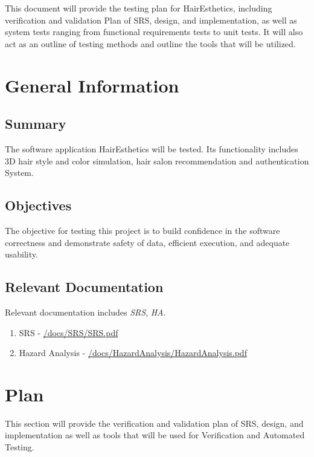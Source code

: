 \documentclass[12pt, titlepage]{article}
\begin{document}
\newpage


This document will provide the testing plan for HairEsthetics, including verification and validation Plan of SRS, design, and implementation, as well as system tests ranging from functional requirements tests to unit tests. It will also act as an outline of testing methods and outline the tools that will be utilized.

\section{General Information}

\subsection{Summary}


  The software application HairEsthetics will be tested. Its functionality includes 3D hair style and color simulation, hair salon recommendation and authentication System. 

\subsection{Objectives}

The objective for testing this project is to build confidence in the software correctness and demonstrate
safety of data, efficient execution, and adequate usability. 

\subsection{Relevant Documentation}

Relevant documentation includes \textit{SRS}, \textit{HA}.
\begin{enumerate}
    \item SRS - \href{https://github.com/marlon4dashen/Hairesthetics/blob/main/docs/SRS/SRS.pdf}{/docs/SRS/SRS.pdf}
    \item Hazard Analysis - \href{https://github.com/marlon4dashen/Hairesthetics/blob/main/docs/HazardAnalysis/HazardAnalysis.pdf}{/docs/HazardAnalysis/HazardAnalysis.pdf}
\end{enumerate}
\section{Plan}

This section will provide the verification and validation plan of SRS, design, and implementation as well as tools that will be used for Verification and Automated Testing.
  
\end{document}
